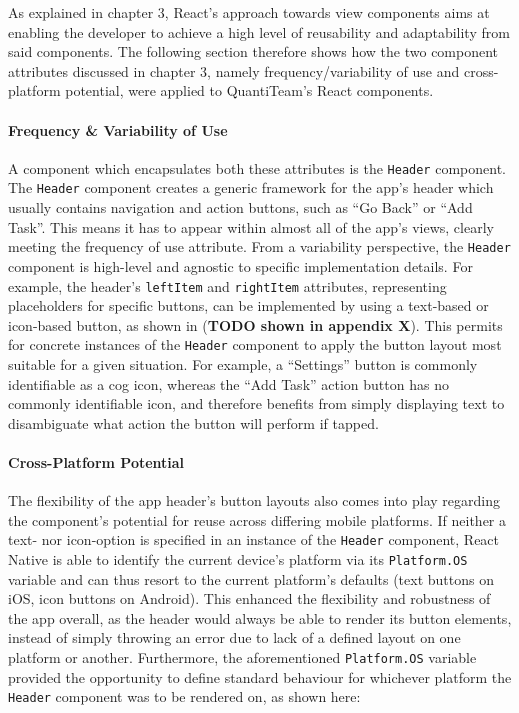 \documentclass[12pt]{report}
\let\oldparagraph\paragraph
\renewcommand{\paragraph}[1]{\oldparagraph{#1}\mbox{}}
\begin{document}
As explained in chapter 3, React's approach towards view components aims
at enabling the developer to achieve a high level of reusability and
adaptability from said components. The following section therefore shows
how the two component attributes discussed in chapter 3, namely
frequency/variability of use and cross-platform potential, were applied
to QuantiTeam's React components.

\paragraph{Frequency \& Variability of
Use}\label{frequency-variability-of-use}

A component which encapsulates both these attributes is the
\texttt{Header} component. The \texttt{Header} component creates a
generic framework for the app's header which usually contains navigation
and action buttons, such as ``Go Back'' or ``Add Task''. This means it
has to appear within almost all of the app's views, clearly meeting the
frequency of use attribute. From a variability perspective, the
\texttt{Header} component is high-level and agnostic to specific
implementation details. For example, the header's \texttt{leftItem} and
\texttt{rightItem} attributes, representing placeholders for specific
buttons, can be implemented by using a text-based or icon-based button,
as shown in (\textbf{TODO shown in appendix X}). This permits for
concrete instances of the \texttt{Header} component to apply the button
layout most suitable for a given situation. For example, a ``Settings''
button is commonly identifiable as a cog icon, whereas the ``Add Task''
action button has no commonly identifiable icon, and therefore benefits
from simply displaying text to disambiguate what action the button will
perform if tapped.

\paragraph{Cross-Platform Potential}\label{cross-platform-potential}

The flexibility of the app header's button layouts also comes into play
regarding the component's potential for reuse across differing mobile
platforms. If neither a text- nor icon-option is specified in an
instance of the \texttt{Header} component, React Native is able to
identify the current device's platform via its \texttt{Platform.OS}
variable and can thus resort to the current platform's defaults (text
buttons on iOS, icon buttons on Android). This enhanced the flexibility
and robustness of the app overall, as the header would always be able to
render its button elements, instead of simply throwing an error due to
lack of a defined layout on one platform or another. Furthermore, the
aforementioned \texttt{Platform.OS} variable provided the opportunity to
define standard behaviour for whichever platform the \texttt{Header}
component was to be rendered on, as shown here:
\end{document}
